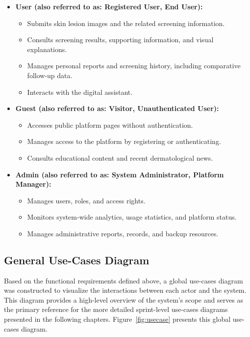 	\begin{itemize}
	  \item \textbf{User (also referred to as: Registered User, End User):}
	    \begin{itemize}
	      \item Submits skin lesion images and the related screening information.
	      \item Consults screening results, supporting information, and visual explanations.
	      \item Manages personal reports and screening history, including comparative
	            follow-up data.
	      \item Interacts with the digital assistant.
	    \end{itemize}
	
	  \item \textbf{Guest (also referred to as: Visitor, Unauthenticated User):}
	    \begin{itemize}
	      \item Accesses public platform pages without authentication.
	      \item Manages access to the platform by registering or authenticating.
	      \item Consults educational content and recent dermatological news.
	    \end{itemize}
	
	  \item \textbf{Admin (also referred to as: System Administrator, Platform Manager):}
	    \begin{itemize}
	      \item Manages users, roles, and access rights.
	      \item Monitors system-wide analytics, usage statistics, and platform status.
	      \item Manages administrative reports, records, and backup resources.
	    \end{itemize}
	\end{itemize}
	
	\subsection{General Use-Cases Diagram}
	
	Based on the functional requirements defined above, a global use-cases diagram was constructed to visualize the interactions between each actor and the system. This diagram provides a high-level overview of the system's scope and serves as the primary reference for the more detailed sprint-level use-cases diagrams presented in the following chapters. Figure~\ref{fig:usecase} presents this global use-cases diagram.
	
